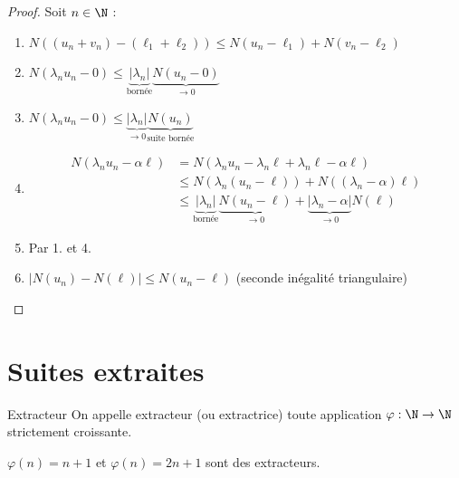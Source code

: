 

\begin{proof}
    Soit $n \in \N$ :
    \begin{enumerate}
        \item $N((u_n + v_n) - (\ell_1 + \ell_2)) \leqslant N(u_n - \ell_1) + N(v_n - \ell_2)$
        \item $N(\lambda_n u_n- 0) \leqslant \underbrace{|\lambda_n|}_{\text{bornée}} \underbrace{N(u_n - 0)}_{\rightarrow 0}$
        \item $N(\lambda_n u_n - 0) \leqslant \underbrace{|\lambda_n|}_{\rightarrow 0} \underbrace{N(u_n)}_{\text{suite bornée}}$
        \item 
        \begin{align*}
            N(\lambda_n u_n - \alpha \ell) & = N(\lambda_n u_n - \lambda_n \ell + \lambda_n \ell - \alpha \ell) \\
            & \leqslant N(\lambda_n (u_n - \ell)) + N((\lambda_n - \alpha) \ell) \\
            & \leqslant \underbrace{|\lambda_n|}_{\text{bornée}} \underbrace{N(u_n - \ell)}_{\rightarrow 0} + \underbrace{|\lambda_n - \alpha|}_{\rightarrow 0} N(\ell) 
        \end{align*}
        \item Par 1. et 4.
        \item $|N(u_n) - N(\ell)| \leqslant N(u_n - \ell)$ (seconde inégalité triangulaire)
    \end{enumerate}
\end{proof}


\section{Suites extraites}

\begin{definition}{Extracteur}{}
    On appelle extracteur (ou extractrice) toute application $\varphi : \N \to \N$ strictement croissante.
\end{definition}

\begin{exemple}
    $\varphi (n) = n +1$ et $\varphi (n) = 2n + 1$ sont des extracteurs.    
\end{exemple}

